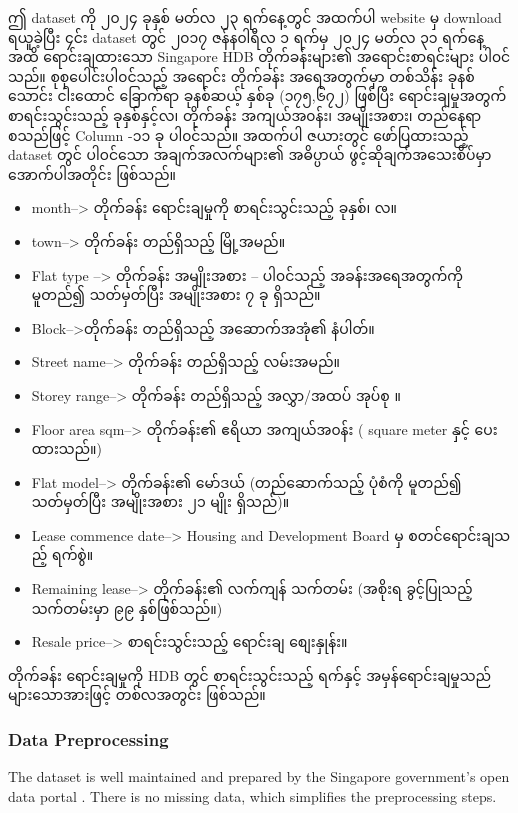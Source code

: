 ဤ dataset ကို ၂၀၂၄ ခုနှစ် မတ်လ ၂၃ ရက်နေ့တွင် အထက်ပါ website မှ download ရယူခဲ့ပြီး ၄င်း dataset တွင် ၂၀၁၇ ဇန်န၀ါရီလ ၁ ရက်မှ ၂၀၂၄ မတ်လ ၃၁ ရက်နေ့အထိ ရောင်းချထားသော Singapore HDB တိုက်ခန်းများ၏ အရောင်းစာရင်းများ ပါ၀င်သည်။ စုစုပေါင်းပါ၀င်သည့် အရောင်း တိုက်ခန်း အရေအတွက်မှာ တစ်သိန်း ခုနစ်သောင်း ငါးထောင် ခြောက်ရာ ခုနစ်ဆယ့် နှစ်ခု (၁၇၅,၆၇၂)  ဖြစ်ပြီး ရောင်းချမှုအတွက် စာရင်းသွင်းသည့် ခုနှစ်နှင့်လ၊ တိုက်ခန်း အကျယ်အ၀န်း၊ အမျိုးအစား၊ တည်နေရာ စသည်ဖြင့် Column -၁၁ ခု ပါ၀င်သည်။ အထက်ပါ ဇယားတွင် ဖော်ပြထားသည့် dataset တွင် ပါ၀င်သော အချက်အလက်များ၏ အဓိပ္ပာယ် ဖွင့်ဆိုချက်အသေးစိပ်မှာ အောက်ပါအတိုင်း ဖြစ်သည်။ 

\begin{itemize}
  \item month--> တိုက်ခန်း ရောင်းချမှုကို စာရင်းသွင်းသည့် ခုနှစ်၊ လ။
  \item town-->  တိုက်ခန်း  တည်ရှိသည့် မြို့အမည်။ 
  \item Flat type --> တိုက်ခန်း အမျိုးအစား -- ပါ၀င်သည့် အခန်းအရေအတွက်ကို မူတည်၍ သတ်မှတ်ပြီး အမျိုးအစား ၇ ခု ရှိသည်။ 
  \item Block-->တိုက်ခန်း တည်ရှိသည့် အဆောက်အအုံ၏ နံပါတ်။
  \item Street name--> တိုက်ခန်း  တည်ရှိသည့် လမ်းအမည်။ 
  \item Storey range--> တိုက်ခန်း တည်ရှိသည့် အလွှာ/အထပ် အုပ်စု ။ 
  \item Floor area sqm--> တိုက်ခန်း၏ ဧရိယာ အကျယ်အ၀န်း ( square meter နှင့် ပေးထားသည်။)
  \item Flat model--> တိုက်ခန်း၏ မော်ဒယ် (တည်ဆောက်သည့် ပုံစံကို မူတည်၍ သတ်မှတ်ပြီး အမျိုးအစား ၂၁ မျိုး ရှိသည်)။ 
  \item Lease commence date--> Housing and Development Board မှ စတင်ရောင်းချသည့် ရက်စွဲ။ 
  \item Remaining lease--> တိုက်ခန်း၏ လက်ကျန် သက်တမ်း (အစိုးရ ခွင့်ပြုသည့် သက်တမ်းမှာ ၉၉ နှစ်ဖြစ်သည်။)
  \item Resale price--> စာရင်းသွင်းသည့် ရောင်းချ စျေးနှုန်း။ 
\end{itemize}
\begin{remark}
တိုက်ခန်း ရောင်းချမှုကို HDB တွင် စာရင်းသွင်းသည့် ရက်နှင့် အမှန်ရောင်းချမှုသည် များသောအားဖြင့် တစ်လအတွင်း ဖြစ်သည်။
\end{remark}
\subsubsection{Data Preprocessing}
The dataset is well maintained and prepared by the Singapore government's open data portal \cite{web:SGdata}. There is no missing data, which simplifies the preprocessing steps. 

